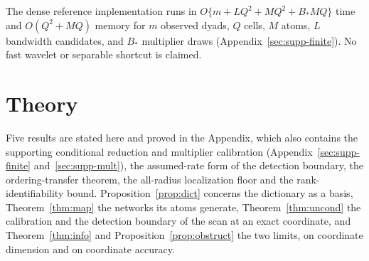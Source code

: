 \documentclass[11pt]{article}
\theoremstyle{definition}
\newcommand{\1}{\mathbf 1}\newcommand{\op}{\operatorname}
\begin{document}
\begin{center}
\end{center}

The dense reference implementation runs in $O\{m+LQ^2+MQ^2+B_*MQ\}$ time and
$O(Q^2+MQ)$ memory for $m$ observed dyads, $Q$ cells, $M$ atoms, $L$ bandwidth candidates, and $B_*$
multiplier draws (Appendix~\ref{sec:supp-finite}).  No fast wavelet or separable shortcut is
claimed.



\section{Theory}                                          \label{sec:results}

Five results are stated here and proved in the Appendix, which also contains
the supporting conditional reduction and multiplier calibration
(Appendix~\ref{sec:supp-finite} and~\ref{sec:supp-mult}), the assumed-rate
form of the detection boundary, the ordering-transfer theorem, the all-radius
localization floor and the rank-identifiability bound.  Proposition~\ref{prop:dict}
concerns the dictionary as a basis, Theorem~\ref{thm:map} the networks its
atoms generate, Theorem~\ref{thm:uncond} the calibration and the detection
boundary of the scan at an exact coordinate, and Theorem~\ref{thm:info} and
Proposition~\ref{prop:obstruct} the two limits, on coordinate dimension and on
coordinate accuracy.
\end{document}
